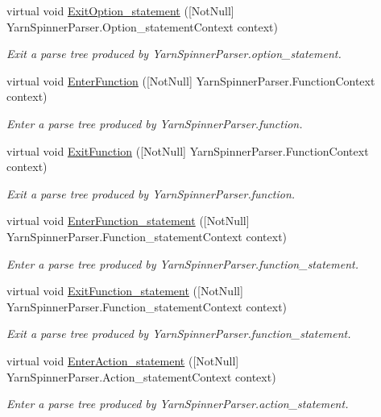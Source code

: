 \begin{DoxyCompactItemize}
virtual void \hyperlink{a00190_a925b4f097ef5e2d7c6ed367bede0bf0d}{Exit\-Option\-\_\-statement} (\mbox{[}Not\-Null\mbox{]} Yarn\-Spinner\-Parser.\-Option\-\_\-statement\-Context context)
\begin{DoxyCompactList}\small\item\em Exit a parse tree produced by Yarn\-Spinner\-Parser.\-option\-\_\-statement. \end{DoxyCompactList}\item 
virtual void \hyperlink{a00190_ae55a7ade788bb17bdb6b52522e181098}{Enter\-Function} (\mbox{[}Not\-Null\mbox{]} Yarn\-Spinner\-Parser.\-Function\-Context context)
\begin{DoxyCompactList}\small\item\em Enter a parse tree produced by Yarn\-Spinner\-Parser.\-function. \end{DoxyCompactList}\item 
virtual void \hyperlink{a00190_a1cf7a34cdb2d3604ce59f8428c720013}{Exit\-Function} (\mbox{[}Not\-Null\mbox{]} Yarn\-Spinner\-Parser.\-Function\-Context context)
\begin{DoxyCompactList}\small\item\em Exit a parse tree produced by Yarn\-Spinner\-Parser.\-function. \end{DoxyCompactList}\item 
virtual void \hyperlink{a00190_a812a7fc8d3e7d9d94dc0a2919fa19d7a}{Enter\-Function\-\_\-statement} (\mbox{[}Not\-Null\mbox{]} Yarn\-Spinner\-Parser.\-Function\-\_\-statement\-Context context)
\begin{DoxyCompactList}\small\item\em Enter a parse tree produced by Yarn\-Spinner\-Parser.\-function\-\_\-statement. \end{DoxyCompactList}\item 
virtual void \hyperlink{a00190_a51a618b740ae76bef859c69cf1f35786}{Exit\-Function\-\_\-statement} (\mbox{[}Not\-Null\mbox{]} Yarn\-Spinner\-Parser.\-Function\-\_\-statement\-Context context)
\begin{DoxyCompactList}\small\item\em Exit a parse tree produced by Yarn\-Spinner\-Parser.\-function\-\_\-statement. \end{DoxyCompactList}\item 
virtual void \hyperlink{a00190_ac4e5829f87772c872d57dfd30e4f0450}{Enter\-Action\-\_\-statement} (\mbox{[}Not\-Null\mbox{]} Yarn\-Spinner\-Parser.\-Action\-\_\-statement\-Context context)
\begin{DoxyCompactList}\small\item\em Enter a parse tree produced by Yarn\-Spinner\-Parser.\-action\-\_\-statement. \end{DoxyCompactList}\item 

\end{DoxyCompactItemize}
